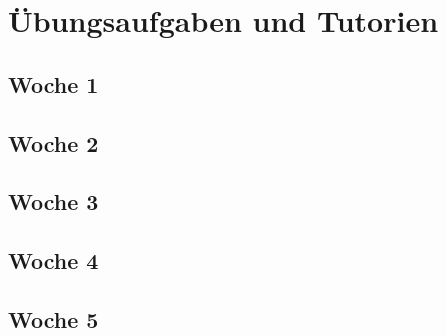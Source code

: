     

    

    


    


    

    



    


    
    


    


    

    
    
    
    

    \part{Übungsaufgaben und Tutorien}\label{part:ubungsaufgaben-und-tutorien}


    \chapter{Woche 1}\label{ch:woche-1}
    
    \chapter{Woche 2}\label{ch:woche-2}
    
    \chapter{Woche 3}\label{ch:woche-3}
    
    
    \chapter{Woche 4}\label{ch:woche-4}
    
    
    \chapter{Woche 5}\label{ch:woche-5}
    

